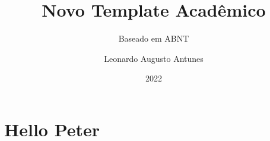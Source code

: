 \documentclass{AcademicNew}
\author{Leonardo Augusto Antunes}
\title{Novo Template Acadêmico}
\subtitle{Baseado em ABNT}
\date{2022}
\begin{document}
    \cover
    \titlePage
    \contents
    
    
    \biblio

    \appendix
    \section{Hello Peter}
\end{document}
